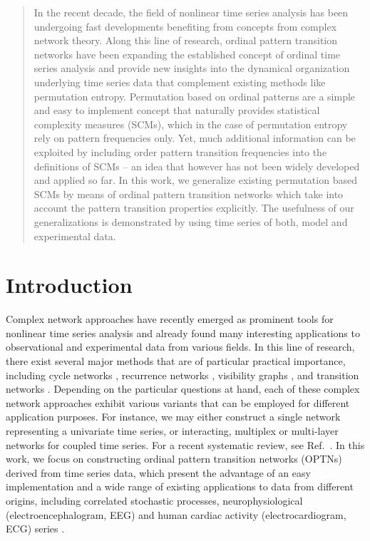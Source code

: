 \documentclass[aip,cha,reprint,nofootinbib]{revtex4-1}
\begin{document}
\maketitle

\begin{quotation}
In the recent decade, the field of nonlinear time series analysis has been undergoing fast developments benefiting from concepts from complex network theory. Along this line of research, ordinal pattern transition networks have been expanding the established concept of ordinal time series analysis and provide new insights into the dynamical organization underlying time series data that complement existing methods like permutation entropy. Permutation based on ordinal patterns are a simple and easy to implement concept that naturally provides statistical complexity measures (SCMs), which in the case of permutation entropy rely on pattern frequencies only. Yet, much additional information can be exploited by including order pattern transition frequencies into the definitions of SCMs -- an idea that however has not been widely developed and applied so far. In this work, we generalize existing permutation based SCMs by means of ordinal pattern transition networks which take into account the pattern transition properties explicitly. The usefulness of our generalizations is demonstrated by using time series of both, model and experimental data. 
\end{quotation}

\section{Introduction}
Complex network approaches \cite{ZouPR2018} have recently emerged as prominent tools for nonlinear time series analysis \cite{Kantz97,Sprott2003} and already found many interesting applications to observational and experimental data from various fields. In this line of research, there exist several major methods that are of particular practical importance, including cycle networks \cite{ZhangPRL2006}, recurrence networks \cite{MarwanPLA2009,Donner2010a}, visibility graphs \cite{Lacasa2008,Nunez2012}, and transition networks \cite{Nicolis2005,MichaelChaos2015}. Depending on the particular questions at hand, each of these complex network approaches exhibit various variants that can be employed for different application purposes. For instance, we may either construct a single network representing a univariate time series, or interacting, multiplex or multi-layer networks for coupled time series. For a recent systematic review, see Ref.~\cite{ZouPR2018}. In this work, we focus on constructing ordinal pattern transition networks (OPTNs) derived from time series data, which present the advantage of an easy implementation and a wide range of existing applications to data from different origins, including correlated stochastic processes, neurophysiological (electroencephalogram, EEG) and human cardiac activity (electrocardiogram, ECG) series \cite{MichaelChaos2015,KulpChaos2016,zhangSciRep2017,McCullough2017b,BorgesAMC2019,Subramaniyam2020}. 
\end{document}
